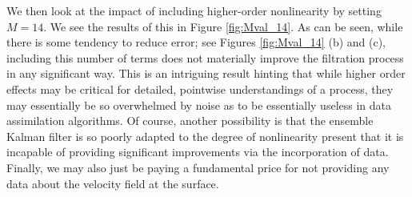 We then look at the impact of including higher-order nonlinearity by setting $M=14$.  We see the results of this in Figure \ref{fig:Mval_14}.  As can be seen, while there is some tendency to reduce error; see Figures \ref{fig:Mval_14} (b) and (c), including this number of terms does not materially improve the filtration process in any significant way.  This is an intriguing result hinting that while higher order effects may be critical for detailed, pointwise understandings of a process, they may essentially be so overwhelmed by noise as to be essentially useless in data assimilation algorithms.  Of course, another possibility is that the ensemble Kalman filter is so poorly adapted to the degree of nonlinearity present that it is incapable of providing significant improvements via the incorporation of data.  Finally, we may also just be paying a fundamental price for not providing any data about the velocity field at the surface.  
